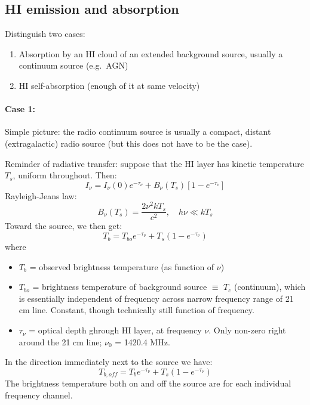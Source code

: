 \documentclass[12pt]{article}
\newcommand{\mar}[1]{\hspace{0pt}\marginpar{-\textcolor{black}{#1}-}}
\newcommand{\mynotes}[1]{\textcolor{mygreen}{#1}}
\begin{document}
\subsection{HI emission and absorption}
\mar{41}Distinguish two cases:
\begin{enumerate}
    \item Absorption by an HI cloud of an extended background source, usually
        a continuum source (e.g.\ AGN)
    \item HI self-absorption (enough of it at same velocity)
\end{enumerate}
\paragraph{Case 1:}
Simple picture: the radio continuum source is usually a compact, distant
(extragalactic) radio source (but this does not have to be the case).

Reminder of radiative transfer: suppose that the HI layer has kinetic
temperature $T_{s}$, uniform throughout. Then:
\[
    I_{\nu} = I_{\nu}(0)e^{-\tau_{\nu}}
    + B_{\nu} (T_{s}) \left[ 1 - e^{-\tau_{\nu}} \right]
    \]
Rayleigh-Jeans law:
\[
    B_{\nu} (T_{s}) = \frac{2\nu^{2}kT_{s}}{c^{2}}, \quad h\nu \ll kT_{s}
    \]
Toward the source, we then get:
\[
    T_{b} = T_{bo} e^{-\tau_{\nu}} + T_{s} \left( 1 - e^{-\tau_{\nu}} \right)
    \]
where
\begin{itemize}
    \item $T_{b}$ = observed brightness temperature (as function of $\nu$)
    \item $T_{bo}$ = brightness temperature of background source $\equiv$ $T_{c}$
        (continuum), which is essentially independent of frequency across narrow
        frequency range of 21 cm line. \mynotes{Constant, though technically still
        function of frequency.}
    \item $\tau_{\nu}$ = optical depth ghrough HI layer, at frequency $\nu$.
        Only non-zero right around the 21 cm line; $\nu_{0}$ = 1420.4 MHz.
\end{itemize}

\mar{42}In the direction immediately next to the source we have:
\[
    T_{b, off} = T_{b} e^{-\tau_{\nu}} + T_{s} \left( 1 - e^{-\tau_{\nu}} \right)
    \]
The brightness temperature both on and off the source are for each
individual frequency channel.
\end{document}
